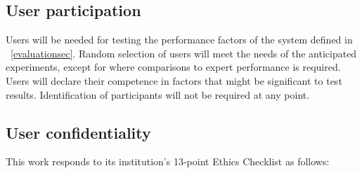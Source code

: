 \documentclass[a4paper, 11pt]{article}
\begin{document}
\subsection{User participation}
Users will be needed for testing the performance factors of the system defined in ~\cref{evaluationsec}. Random selection of users will meet the needs of the anticipated experiments, except for where comparisons to expert performance is required. Users will declare their competence in factors that might be significant to test results. Identification of participants will not be required at any point.
\subsection{User confidentiality}
This work responds to its institution's 13-point Ethics Checklist as follows:
\end{document}
